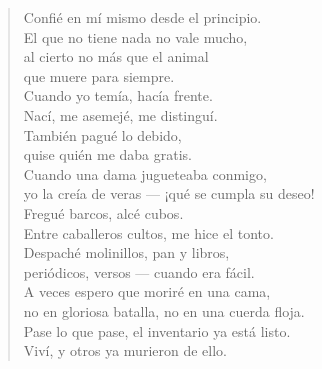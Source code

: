 \documentclass[11pt]{book}
\newcommand*{\centeredornament}{\centerline{\pgfornament[width=6cm]{88}}}
\begin{document}
\begin{verse}
  Confié en mí mismo desde el principio. \\
  El que no tiene nada no vale mucho, \\
  al cierto no más que el animal \\
  que muere para siempre. \\
  Cuando yo temía, hacía frente. \\
  Nací, me asemejé, me distinguí. \\
  También pagué lo debido, \\
  quise quién me daba gratis. \\
  Cuando una dama jugueteaba conmigo, \\
  yo la creía de veras --- ¡qué se cumpla su deseo!\hspace*{-1mm} \\
  Fregué barcos, alcé cubos. \\
  Entre caballeros cultos, me hice el tonto. \\
  Despaché molinillos, pan y libros, \\
  periódicos, versos --- cuando era fácil. \\
  A veces espero que moriré en una cama, \\
  no en gloriosa batalla, no en una cuerda floja. \\
  Pase lo que pase, el inventario ya está listo. \\
  Viví, y otros ya murieron de ello.
\end{verse}

\newpage

\vspace*{-15mm}
\centeredornament


\end{document}
